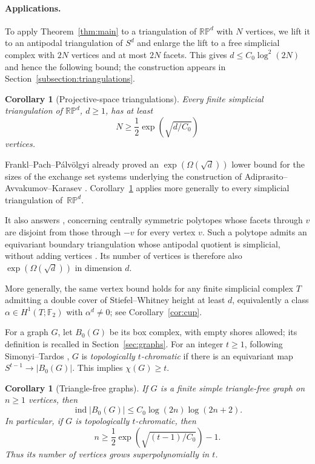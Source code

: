 \documentclass[11pt]{article}
\newtheorem{corollary}[theorem]{Corollary}
\theoremstyle{remark}
\DeclareMathOperator{\ind}{ind}
\newcommand{\RP}{\mathbb {RP}}
\newcommand{\Czero}{C_0}
\begin{document}
\paragraph{Applications.}
To apply Theorem~\ref{thm:main} to a triangulation of $\RP^d$
with $N$ vertices, we lift it to an antipodal triangulation of
$S^d$ and enlarge the lift to a free simplicial complex with
$2N$ vertices and at most $2N$ facets. This gives
$d\leq\Czero\log^2(2N)$ and hence the following bound; the
construction appears in Section~\ref{subsection:triangulations}.
\begin{corollary}[Projective-space triangulations]\label{cor:rp}
Every finite simplicial triangulation of $\RP^d$, $d\geq1$, has at least
\begin{equation}\label{eq:rp}
 N\geq \frac12\exp\!\left(\sqrt{d/\Czero}\right)
\end{equation}
vertices.
\end{corollary}
Frankl--Pach--P\'alv\"olgyi \cite[Theorem~1]{FPP} already proved an
$\exp(\Omega(\sqrt d))$ lower bound for the sizes of the exchange
set systems underlying the construction of Adiprasito--Avvakumov--Karasev \cite{AAK}.
Corollary~\ref{cor:rp} applies more generally to every simplicial triangulation of~$\RP^d$.

It also answers \cite[Question~3.8]{AAK}, concerning centrally symmetric
polytopes whose facets through $v$ are disjoint from those through $-v$
for every vertex $v$. Such a polytope admits an equivariant boundary
triangulation whose antipodal quotient is simplicial, without adding
vertices \cite[Corollary~2.2]{AAK}. Its number of vertices is therefore
also $\exp(\Omega(\sqrt d))$ in dimension $d$.

More generally, the same vertex bound holds for any finite simplicial
complex $T$ admitting a double cover of Stiefel--Whitney height at
least $d$, equivalently a class $\alpha\in H^1(T;\mathbb F_2)$ with
$\alpha^d\ne0$; see Corollary~\ref{cor:cup}.

For a graph $G$, let $B_0(G)$ be its box complex, with empty shores
allowed; its definition is recalled in Section~\ref{sec:graphs}.
For an integer $t\geq1$, following Simonyi--Tardos
\cite[Definition~3]{ST}, $G$ is \emph{topologically
$t$-chromatic} if there is an equivariant map $S^{t-1}\to |B_0(G)|$.
This implies $\chi(G)\geq t$.

\begin{corollary}[Triangle-free graphs]\label{cor:graph}
If $G$ is a finite simple triangle-free graph on $n\geq1$ vertices, then
\begin{equation}\label{eq:graphindex}
 \ind |B_0(G)|\leq\Czero\log(2n)\log(2n+2).
\end{equation}
In particular, if $G$ is topologically $t$-chromatic, then
\begin{equation}\label{eq:graphsize}
 n\geq \frac12\exp\!\left(\sqrt{(t-1)/\Czero}\right)-1.
\end{equation}
Thus its number of vertices grows superpolynomially in $t$.
\end{corollary}
\end{document}
